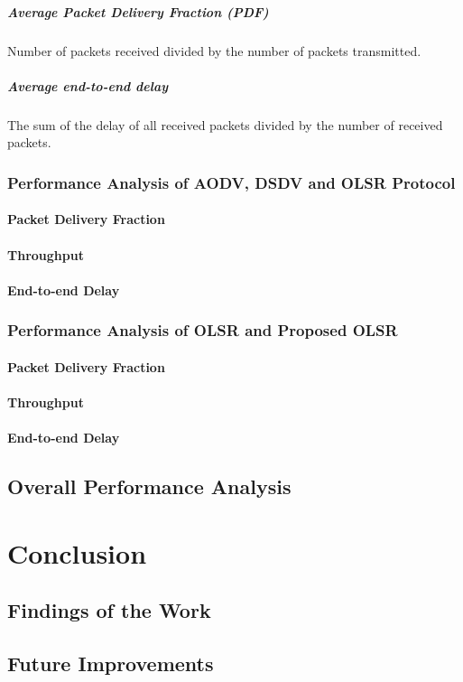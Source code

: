 \documentclass[12pt,a4paper]{report}
\begin{document}
\paragraph{Average Packet Delivery Fraction (PDF)}
Number of packets received divided by the number of packets transmitted.
\paragraph{Average end-to-end delay}
 The sum of the delay of all received packets divided by the number of received packets.
\subsection{Performance Analysis of AODV, DSDV and OLSR Protocol}
\subsubsection{Packet Delivery Fraction}
\subsubsection{Throughput}
\subsubsection{End-to-end Delay}

\subsection{Performance Analysis of OLSR and Proposed OLSR}
\subsubsection{Packet Delivery Fraction}
\subsubsection{Throughput}
\subsubsection{End-to-end Delay}

\section{Overall Performance Analysis}

\chapter{Conclusion}
\section{Findings of the Work}
\section{Future Improvements}
\end{document}
